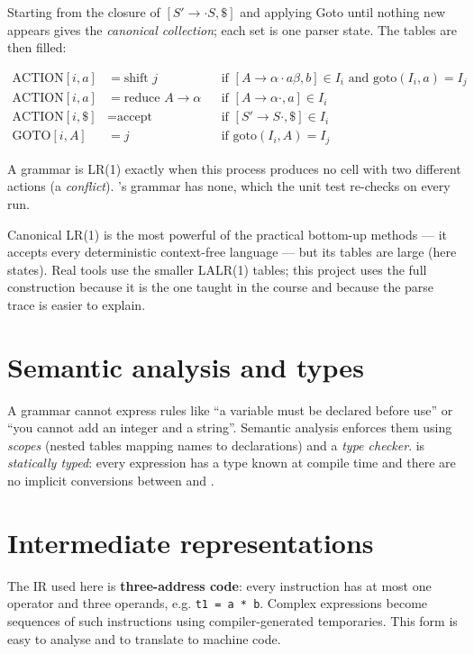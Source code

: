 Starting from the closure of $[S' \to \cdot S, \$]$ and applying Goto until nothing new appears gives the \emph{canonical collection}; each set is one parser state. The tables are then filled:

\begin{align*}
\text{ACTION}[i, a] &= \text{shift } j && \text{if } [A \to \alpha \cdot a\beta, b] \in I_i \text{ and } \mathrm{goto}(I_i, a) = I_j\\
\text{ACTION}[i, a] &= \text{reduce } A \to \alpha && \text{if } [A \to \alpha \cdot, a] \in I_i\\
\text{ACTION}[i, \$] &= \text{accept} && \text{if } [S' \to S \cdot, \$] \in I_i\\
\text{GOTO}[i, A] &= j && \text{if } \mathrm{goto}(I_i, A) = I_j
\end{align*}

A grammar is LR(1) exactly when this process produces no cell with two different actions (a \emph{conflict}). \nova{}'s grammar has none, which the unit test  re-checks on every run.

\begin{keybox}
Canonical LR(1) is the most powerful of the practical bottom-up methods --- it accepts every deterministic context-free language --- but its tables are large (here \LRStates{} states). Real tools use the smaller LALR(1) tables; this project uses the full construction because it is the one taught in the course and because the parse trace is easier to explain.
\end{keybox}

\section{Semantic analysis and types}
A grammar cannot express rules like ``a variable must be declared before use'' or ``you cannot add an integer and a string''. Semantic analysis enforces them using \emph{scopes} (nested tables mapping names to declarations) and a \emph{type checker}. \nova{} is \emph{statically typed}: every expression has a type known at compile time and there are no implicit conversions between  and .

\section{Intermediate representations}
The IR used here is \textbf{three-address code}: every instruction has at most one operator and three operands, e.g. \verb|t1 = a * b|. Complex expressions become sequences of such instructions using compiler-generated temporaries. This form is easy to analyse and to translate to machine code.

